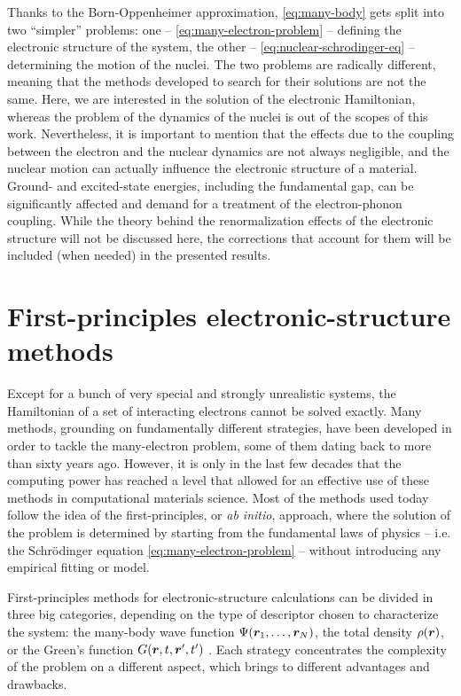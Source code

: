 Thanks to the Born-Oppenheimer approximation, \cref{eq:many-body} gets split into two ``simpler'' problems: one -- \cref{eq:many-electron-problem} -- defining the electronic structure of the system, the other -- \cref{eq:nuclear-schrodinger-eq} -- determining the motion of the nuclei. The two problems are radically different, meaning that the methods developed to search for their solutions are not the same. Here, we are interested in the solution of the electronic Hamiltonian, whereas the problem of the dynamics of the nuclei is out of the scopes of this work. Nevertheless, it is important to mention that the effects due to the coupling between the electron and the nuclear dynamics are not always negligible, and the nuclear motion can actually influence the electronic structure of a material. Ground- and excited-state energies, including the fundamental gap, can be significantly affected and demand for a treatment of the electron-phonon coupling. While the theory behind the renormalization effects of the electronic structure will not be discussed here, the corrections that account for them will be included (when needed) in the presented results.

\section{First-principles electronic-structure methods\label{sec:first-principles-methods}}
Except for a bunch of very special and strongly unrealistic systems, the Hamiltonian of a set of interacting electrons cannot be solved exactly. Many methods, grounding on fundamentally different strategies, have been developed in order to tackle the many-electron problem, some of them dating back to more than sixty years ago. However, it is only in the last few decades that the computing power has reached a level that allowed for an effective use of these methods in computational materials science. Most of the methods used today follow the idea of the first-principles, or \emph{ab initio}, approach, where the solution of the problem is determined by starting from the fundamental laws of physics -- i.e. the Schr\"{o}dinger equation \eqref{eq:many-electron-problem} -- without introducing any empirical fitting or model.

First-principles methods for electronic-structure calculations can be divided in three big categories, depending on the type of descriptor chosen to characterize the system: the many-body wave function $\Psi({\bm r}_1, \dots, {\bm r}_N)$, the total density $\rho({\bm r})$, or the Green's function $G({\bm r},t,{\bm r}',t')$ \cite{marzari_electronic-structure_2021}. Each strategy concentrates the complexity of the problem on a different aspect, which brings to different advantages and drawbacks.

